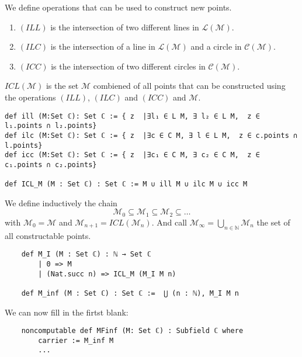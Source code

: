 \begin{definition}
    \label{def:rules_to_constructed_a_point}
    We define operations that can be used to construct new points.
    \begin{enumerate}
        \item $(ILL)$ is the intersection of two different lines in $\mathcal{L(M)}$.
        \item $(ILC)$ is the intersection of a line in $\mathcal{L(M)}$ and a circle in $\mathcal{C(M)}$.
        \item $(ICC)$ is the intersection of two different circles in $\mathcal{C(M)}$.
    \end{enumerate}
    $ICL(\mathcal{M})$ is the set $\mathcal{M}$ combiened of all points that can be constructed using the operations $(ILL)$, $(ILC)$ and $(ICC)$ and $\mathcal{M}$.
\end{definition}

\begin{lstlisting}
def ill (M:Set ℂ): Set ℂ := { z  |∃l₁ ∈ L M, ∃ l₂ ∈ L M,  z ∈ l₁.points ∩ l₂.points}
def ilc (M:Set ℂ): Set ℂ := { z  |∃c ∈ C M, ∃ l ∈ L M,  z ∈ c.points ∩ l.points}
def icc (M:Set ℂ): Set ℂ := { z  |∃c₁ ∈ C M, ∃ c₂ ∈ C M,  z ∈ c₁.points ∩ c₂.points}

def ICL_M (M : Set ℂ) : Set ℂ := M ∪ ill M ∪ ilc M ∪ icc M
\end{lstlisting}

\begin{definition}
    \label{def:set_of_constructable_points}
    We define inductively the chain
    \begin{equation*}
        \mathcal{M}_0 \subseteq \mathcal{M}_1 \subseteq \mathcal{M}_2 \subseteq \dots
    \end{equation*}
    with $\mathcal{M}_0 = \mathcal{M}$ and $\mathcal{M}_{n+1} = ICL(\mathcal{M}_n)$.\newline
    And call $\mathcal{M}_{\infty} = \bigcup_{n \in \mathbb{N}} \mathcal{M}_n$ the set of all constructable points.
\end{definition}

\begin{lstlisting}
    def M_I (M : Set ℂ) : ℕ → Set ℂ
        | 0 => M
        | (Nat.succ n) => ICL_M (M_I M n)

    def M_inf (M : Set ℂ) : Set ℂ :=  ⋃ (n : ℕ), M_I M n
\end{lstlisting}

We can now fill in the firtst blank:
\begin{lstlisting}
    noncomputable def MFinf (M: Set ℂ) : Subfield ℂ where
        carrier := M_inf M
        ...
\end{lstlisting}
